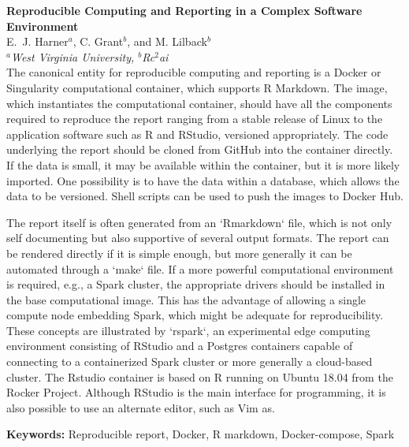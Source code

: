 
\setlength{\textwidth}{160mm}\setlength{\textheight}{240mm}
\setlength{\oddsidemargin}{0mm}\setlength{\evensidemargin}{0mm}
\setlength{\topmargin}{-10mm}
\setlength{\parindent}{0mm} 
\pagestyle{empty}	%



{\Large\bf Reproducible Computing and Reporting in a Complex Software Environment}\\[4mm]

E.~J. Harner$^a$, C. Grant$^b$, and  M. Lilback$^b$\\ 				

{\small \em $^a$West Virginia University, $^b$Rc$^2$ai}\\[3mm]

The canonical entity for reproducible computing and reporting is a Docker or Singularity computational container, which supports R Markdown. The image, which instantiates the computational container, should have all the components required to reproduce the report ranging from a stable release of Linux to the application software such as R and RStudio, versioned appropriately. The code underlying the report should be cloned from GitHub into the container directly. If the data is small,  it may be available within the container, but it is more likely imported. One possibility is to have the data within a database, which allows the data to be versioned. Shell scripts can be used to push the images to Docker Hub.

The report itself is often generated from an `Rmarkdown` file, which is not only self documenting but also supportive of several output formats. The report can be rendered directly if it is simple enough, but more generally it can be automated through a `make` file. If a more powerful computational environment is required, e.g., a Spark cluster, the appropriate drivers should be installed in the base computational image. This has the advantage of allowing a single compute node embedding Spark, which might be adequate for reproducibility. These concepts are illustrated by `rspark`, an experimental edge computing environment consisting of RStudio and a Postgres containers capable of connecting to a containerized Spark cluster or more generally a cloud-based cluster. The Rstudio container is based on R running on Ubuntu 18.04 from the Rocker Project. Although RStudio is the main interface for programming, it is also possible to use an alternate editor, such as Vim as.

\textbf{Keywords:} Reproducible report, Docker, R markdown, Docker-compose, Spark


